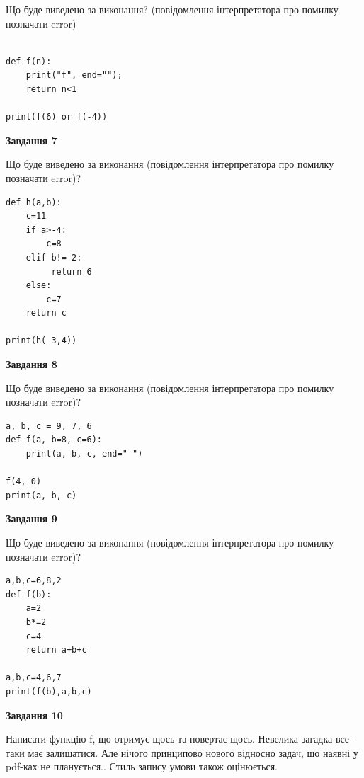 \documentclass[12pt, ukrainian]{article}
\begin{document}
{\begin {large}
Що буде виведено за виконання? (повідомлення інтерпретатора про помилку позначати error)\par
\begin{verbatim}

def f(n):
    print("f", end="");
    return n<1

print(f(6) or f(-4))
\end{verbatim}

{\begin {center}\textbf{Завдання 7}\end {center}}

Що буде виведено за виконання (повідомлення інтерпретатора про помилку позначати error)?\par
\begin{verbatim}
def h(a,b):
    c=11
    if a>-4:
        c=8
    elif b!=-2:
         return 6
    else: 
        c=7
    return c

print(h(-3,4))
\end{verbatim}

{\begin {center}\textbf{Завдання 8}\end {center}}

Що буде виведено за виконання (повідомлення інтерпретатора про помилку позначати error)?\par
\begin{verbatim}
a, b, c = 9, 7, 6
def f(a, b=8, c=6):
    print(a, b, c, end=" ")

f(4, 0)
print(a, b, c)
\end{verbatim}

{\begin {center}\textbf{Завдання 9}\end {center}}

Що буде виведено за виконання (повідомлення інтерпретатора про помилку позначати error)?\par
\begin{verbatim}
a,b,c=6,8,2
def f(b):
    a=2
    b*=2
    c=4
    return a+b+c

a,b,c=4,6,7
print(f(b),a,b,c)
\end{verbatim}

{\begin {center}\textbf{Завдання 10}\end {center}}


Написати функцiю f, що отримує щось та повертає щось. Невелика загадка все-таки має залишатися. Але нічого принципово нового відносно задач, що наявні у pdf-ках не планується.. Стиль запису умови також оцінюється.\par
\end {large}}
\newpage
\end{document}
